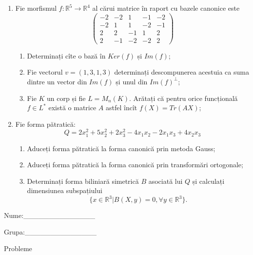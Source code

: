 \documentclass{article}
\begin{document}
\begin{enumerate}
 \item Fie morfismul $f:\mathbb{R}^5 \to \mathbb{R}^4$ al cărui matrice în raport cu bazele canonice este
$$\begin{pmatrix}
-2&-2&1&-1&-2\\
-2&1&1&-2&-1\\
2&2&-1&1&2\\
2&-1&-2&-2&2
\end{pmatrix}$$

\begin{enumerate}
\item Determinați cîte o bază în $Ker(f)$ și $Im(f)$;
\item Fie vectorul $v=(1,3,1,3)$ determinați descompunerea acestuia ca suma dintre un vector din $Im(f)$ și unul din $Im(f)^\perp$;
\item Fie $K$ un corp și fie $L=M_n(K)$. Arătați că pentru orice funcțională $f \in L^*$ există o matrice $A$ astfel încît $f(X)=Tr(AX)$;
\end{enumerate}
\item Fie forma pătratică:
$$Q= 2x_1^2+5x_2^2+2x_3^2-4x_1x_2-2x_1x_3+4x_2x_3$$

\begin{enumerate}
\item Aduceți forma pătratică la forma canonică prin metoda Gauss;
\item Aduceți forma pătratică la forma canonică prin transformări ortogonale;
\item Determinați forma biliniară simetrică $B$ asociată lui $Q$ și calculați dimensiunea subspațiului
$$\{x \in \mathbb{R}^3 | B(X,y)=0,\forall y \in \mathbb{R}^3\}.$$

\end{enumerate}
\end{enumerate}
\newpage
\begin{flushright}
Nume:\_\_\_\_\_\_\_\_\_\_\_\_\_\_
 
 
Grupa:\_\_\_\_\_\_\_\_\_\_\_\_\_\_
\end{flushright}
\begin{center}
\vspace{2cm}
{\Large Probleme}
\vspace{2cm}
\end{center}
\end{document}
